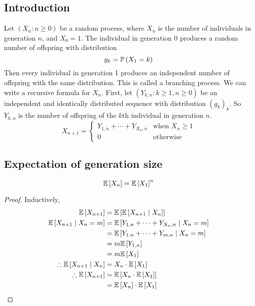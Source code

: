 \subsection{Introduction}
Let \((X_n \colon n \geq 0)\) be a random process, where \(X_n\) is the number of individuals in generation \(n\), and \(X_0 = 1\).
The individual in generation 0 produces a random number of offspring with distribution
\[
	g_k = \mathbb{P}\left({X_1 = k}\right)
\]
Then every individual in generation 1 produces an independent number of offspring with the same distribution.
This is called a branching process.
We can write a recursive formula for \(X_n\).
First, let \((Y_{k, n} \colon k \geq 1, n \geq 0)\) be an independent and identically distributed sequence with distribution \((g_k)_k\).
So \(Y_{k, n}\) is the number of offspring of the \(k\)th individual in generation \(n\).
\[
	X_{n+1} = \begin{cases}
		Y_{1,n} + \cdots + Y_{X_n,n} & \text{when } X_n \geq 1 \\
		0                            & \text{otherwise}
	\end{cases}
\]

\subsection{Expectation of generation size}
\begin{theorem}
	\[
		\mathbb{E}\left[{X_n}\right] = \mathbb{E}\left[{X_1}\right]^n
	\]
\end{theorem}
\begin{proof}
	Inductively,
	\begin{align*}
		\mathbb{E}\left[{X_{n+1}}\right]                     & = \mathbb{E}\left[{\mathbb{E}\left[{X_{n+1} \mid X_n}\right]}\right]                 \\
		\mathbb{E}\left[{X_{n+1} \mid X_n = m}\right]        & = \mathbb{E}\left[{Y_{1,n} + \cdots + Y_{X_n,n} \mid X_n = m}\right] \\
		                                     & = \mathbb{E}\left[{Y_{1,n} + \cdots + Y_{m,n} \mid X_n = m}\right]   \\
		                                     & = m \mathbb{E}\left[{Y_{1,n}}\right]                                 \\
		                                     & = m \mathbb{E}\left[{X_1}\right]                                     \\
		\therefore \mathbb{E}\left[{X_{n+1} \mid X_n}\right] & = X_n \cdot \mathbb{E}\left[{X_1}\right]                             \\
		\therefore \mathbb{E}\left[{X_{n+1}}\right]          & = \mathbb{E}\left[{X_n \cdot \mathbb{E}\left[{X_1}\right]}\right]                    \\
		                                     & = \mathbb{E}\left[{X_n}\right] \cdot \mathbb{E}\left[{X_1}\right]
	\end{align*}
\end{proof}

